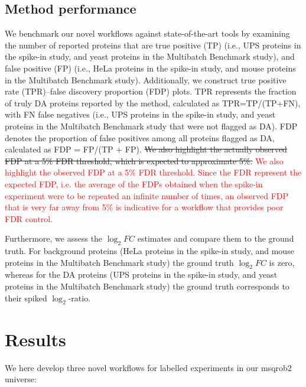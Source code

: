 \documentclass[
  letterpaper,
  DIV=11,
  numbers=noendperiod]{scrartcl}
\begin{document}
\subsection{Method performance}

We benchmark our novel workflows against state-of-the-art tools by
examining the number of reported proteins that are true positive (TP)
(i.e., UPS proteins in the spike-in study, and yeast proteins in the
Multibatch Benchmark study), and false positive (FP) (i.e., HeLa
proteins in the spike-in study, and mouse proteins in the Multibatch
Benchmark study). Additionally, we construct true positive rate
(TPR)--false discovery proportion (FDP) plots. TPR represents the
fraction of truly DA proteins reported by the method, calculated as
TPR=TP/(TP+FN), with FN false negatives (i.e., UPS proteins in the
spike-in study, and yeast proteins in the Multibatch Benchmark study
that were not flagged as DA). FDP denotes the proportion of false
positives among all proteins flagged as DA, calculated as FDP = FP/(TP +
FP).
\sout{We also highlight the actually observed FDP at a 5\% FDR threshold, which is expected to approximate 5\%.}
\textcolor{red}{We also highlight the observed FDP at a 5\% FDR threshold. Since the FDR represent the expected FDP, i.e. the average of the FDPs obtained when the spike-in experiment were to be repeated an infinite number of times, an observed FDP that is very far away from 5\% is indicative for a workflow that provides poor FDR control.}

Furthermore, we assess the \(\log_2 FC\) estimates and compare them to
the ground truth. For background proteins (HeLa proteins in the spike-in
study, and mouse proteins in the Multibatch Benchmark study) the ground
truth \(\log_2 FC\) is zero, whereas for the DA proteins (UPS proteins
in the spike-in study, and yeast proteins in the Multibatch Benchmark
study) the ground truth corresponds to their spiked \(\log_2\)-ratio.

\section{Results}

We here develop three novel workflows for labelled experiments in our
msqrob2 universe:
\end{document}
